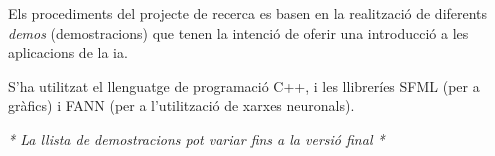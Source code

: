Els procediments del projecte de recerca es basen en la realització de diferents \emph{demos} (demostracions)
que tenen la intenció de oferir una introducció a les aplicacions de la \ac{ia}.

S'ha utilitzat el llenguatge de programació C++, i les llibreríes SFML (per a gràfics) \cite{sfmllib} i FANN \cite{fannlib} (per a l'utilització
de xarxes neuronals).

\emph{* La llista de demostracions pot variar fins a la versió final *}




\cite{mlalgo09}
